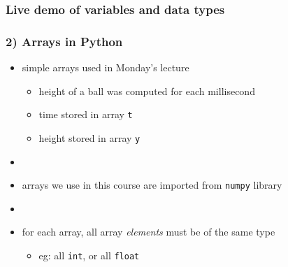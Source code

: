 \documentclass[14pt]{beamer}
\newcommand\red[1]{{\color{red} #1}}
\begin{document}
%
%
%
%
%
%
%


\begin{frame}[fragile]
\frametitle{Live demo of variables and data types}

\end{frame}


\begin{frame}[fragile]

\frametitle{2) Arrays in Python}

\begin{itemize}
	\item simple arrays used in Monday's lecture
	\begin{itemize}
		\item height of a ball was computed for each millisecond
		\item time stored in array \texttt{t}
		\item height stored in array \texttt{y}
	\end{itemize}
	\item[]
	\item arrays we use in this course are imported from \texttt{numpy} library
	\item[]
	\item for each array, all array \red{\emph{elements}} must be of the same type
	\begin{itemize}
		\item eg: all \texttt{int}, or all \texttt{float}
	\end{itemize}
		
\end{itemize}


\end{frame}
\end{document}
